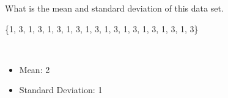 What is the mean and standard deviation of this data set.
\begin{center}
    \{1, 3, 1, 3, 1, 3, 1, 3, 1, 3, 1, 3, 1, 3, 1, 3, 1, 3, 1, 3\}
\end{center}

\begin{solution} \
    \begin{itemize}
        \item Mean: 2
        \item Standard Deviation: 1
    \end{itemize}
\end{solution}